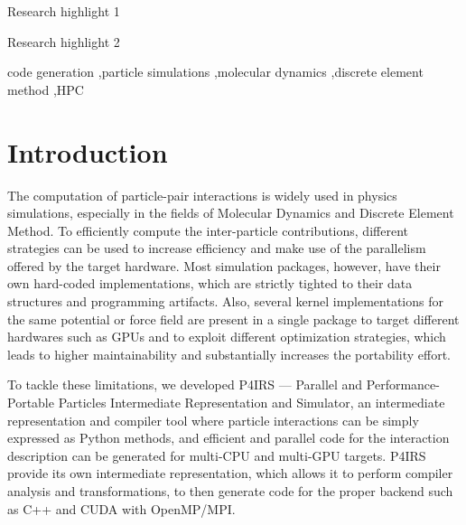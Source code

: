 \documentclass[preprint,12pt]{elsarticle}
\begin{document}
\begin{frontmatter}
\begin{graphicalabstract}
\end{graphicalabstract}

\begin{highlights}
\item Research highlight 1
\item Research highlight 2
\end{highlights}

\begin{keyword}


code generation \sep particle simulations \sep molecular dynamics \sep discrete element method \sep HPC
\end{keyword}

\end{frontmatter}


\section{Introduction}
\label{sec:introduction}

The computation of particle-pair interactions is widely used in physics simulations, especially in the fields of Molecular Dynamics and Discrete Element Method.
To efficiently compute the inter-particle contributions, different strategies can be used to increase efficiency and make use of the parallelism offered by the target hardware.
Most simulation packages, however, have their own hard-coded implementations, which are strictly tighted to their data structures and programming artifacts.
Also, several kernel implementations for the same potential or force field are present in a single package to target different hardwares such as GPUs and to exploit different optimization strategies, which leads to higher maintainability and substantially increases the portability effort.

To tackle these limitations, we developed P4IRS --- Parallel and Performance-Portable Particles Intermediate Representation and Simulator, an intermediate representation and compiler tool where particle interactions can be simply expressed as Python methods, and efficient and parallel code for the interaction description can be generated for multi-CPU and multi-GPU targets.
P4IRS provide its own intermediate representation, which allows it to perform compiler analysis and transformations, to then generate code for the proper backend such as C++ and CUDA with OpenMP/MPI.
\end{document}
